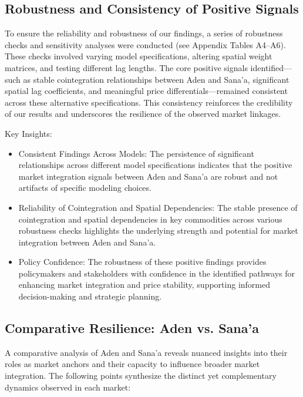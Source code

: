 \subsection{Robustness and Consistency of Positive Signals}

To ensure the reliability and robustness of our findings, a series of robustness checks and sensitivity analyses were conducted (see Appendix Tables A4–A6). These checks involved varying model specifications, altering spatial weight matrices, and testing different lag lengths. The core positive signals identified—such as stable cointegration relationships between Aden and Sana'a, significant spatial lag coefficients, and meaningful price differentials—remained consistent across these alternative specifications. This consistency reinforces the credibility of our results and underscores the resilience of the observed market linkages.

Key Insights:
\begin{itemize}
\item Consistent Findings Across Models: The persistence of significant relationships across different model specifications indicates that the positive market integration signals between Aden and Sana'a are robust and not artifacts of specific modeling choices.
  
\item Reliability of Cointegration and Spatial Dependencies: The stable presence of cointegration and spatial dependencies in key commodities across various robustness checks highlights the underlying strength and potential for market integration between Aden and Sana'a.
  
\item Policy Confidence: The robustness of these positive findings provides policymakers and stakeholders with confidence in the identified pathways for enhancing market integration and price stability, supporting informed decision-making and strategic planning.
\end{itemize}

\subsection{Comparative Resilience: Aden vs. Sana'a}

A comparative analysis of Aden and Sana'a reveals nuanced insights into their roles as market anchors and their capacity to influence broader market integration. The following points synthesize the distinct yet complementary dynamics observed in each market:

